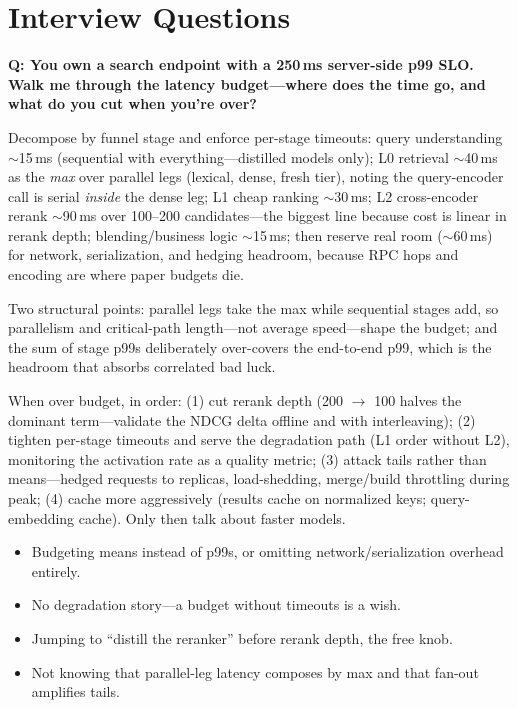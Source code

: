 \section{Interview Questions}
\label{sr:sec:prod_interview}

\begin{interviewq}
\textbf{Q: You own a search endpoint with a 250\,ms server-side p99 SLO. Walk me through the latency budget---where does the time go, and what do you cut when you're over?}

 \quad {} \quad \badgefreq{\freqhigh}

\stronganswer

Decompose by funnel stage and enforce per-stage timeouts: query understanding $\sim$15\,ms (sequential with everything---distilled models only); L0 retrieval $\sim$40\,ms as the \textit{max} over parallel legs (lexical, dense, fresh tier), noting the query-encoder call is serial \textit{inside} the dense leg; L1 cheap ranking $\sim$30\,ms; L2 cross-encoder rerank $\sim$90\,ms over 100--200 candidates---the biggest line because cost is linear in rerank depth; blending/business logic $\sim$15\,ms; then reserve real room ($\sim$60\,ms) for network, serialization, and hedging headroom, because RPC hops and encoding are where paper budgets die.

Two structural points: parallel legs take the max while sequential stages add, so parallelism and critical-path length---not average speed---shape the budget; and the sum of stage p99s deliberately over-covers the end-to-end p99, which is the headroom that absorbs correlated bad luck.

When over budget, in order: (1) cut rerank depth (200 $\to$ 100 halves the dominant term---validate the NDCG delta offline and with interleaving); (2) tighten per-stage timeouts and serve the degradation path (L1 order without L2), monitoring the activation rate as a quality metric; (3) attack tails rather than means---hedged requests to replicas, load-shedding, merge/build throttling during peak; (4) cache more aggressively (results cache on normalized keys; query-embedding cache). Only then talk about faster models.

\redflags
\begin{itemize}
    \item Budgeting means instead of p99s, or omitting network/serialization overhead entirely.
    \item No degradation story---a budget without timeouts is a wish.
    \item Jumping to ``distill the reranker'' before rerank depth, the free knob.
    \item Not knowing that parallel-leg latency composes by max and that fan-out amplifies tails.
\end{itemize}


\end{interviewq}
